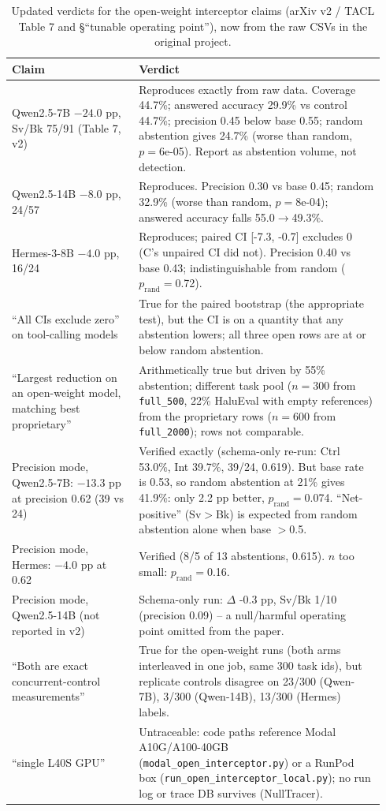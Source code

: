 \begin{table}[t]\centering\small
\caption{Updated verdicts for the open-weight interceptor claims (arXiv v2 / TACL Table 7 and \S``tunable operating point''), now from the raw CSVs in the original project.}
\label{tab:C2_3}
\begin{tabular}{p{0.32\linewidth}p{0.62\linewidth}}
\toprule
Claim & Verdict \\
\midrule
Qwen2.5-7B $-24.0$ pp, Sv/Bk 75/91 (Table 7, v2) & Reproduces exactly from raw data. Coverage 44.7\%; answered accuracy 29.9\% vs control 44.7\%; precision 0.45 below base 0.55; random abstention gives 24.7\% (worse than random, $p{=}$6e-05). Report as abstention volume, not detection. \\
Qwen2.5-14B $-8.0$ pp, 24/57 & Reproduces. Precision 0.30 vs base 0.45; random 32.9\% (worse than random, $p{=}$8e-04); answered accuracy falls 55.0$\to$49.3\%. \\
Hermes-3-8B $-4.0$ pp, 16/24 & Reproduces; paired CI [-7.3, -0.7] excludes 0 (C's unpaired CI did not). Precision 0.40 vs base 0.43; indistinguishable from random ($p_{\mathrm{rand}}{=}$0.72). \\
``All CIs exclude zero'' on tool-calling models & True for the paired bootstrap (the appropriate test), but the CI is on a quantity that any abstention lowers; all three open rows are at or below random abstention. \\
``Largest reduction on an open-weight model, matching best proprietary'' & Arithmetically true but driven by 55\% abstention; different task pool ($n{=}300$ from \texttt{full\_500}, 22\% HaluEval with empty references) from the proprietary rows ($n{=}600$ from \texttt{full\_2000}); rows not comparable. \\
Precision mode, Qwen2.5-7B: $-13.3$ pp at precision 0.62 (39 vs 24) & Verified exactly (schema-only re-run: Ctrl 53.0\%, Int 39.7\%, 39/24, 0.619). But base rate is 0.53, so random abstention at 21\% gives 41.9\%: only 2.2 pp better, $p_{\mathrm{rand}}{=}$0.074. ``Net-positive'' (Sv$>$Bk) is expected from random abstention alone when base $>$0.5. \\
Precision mode, Hermes: $-4.0$ pp at 0.62 & Verified (8/5 of 13 abstentions, 0.615). $n$ too small: $p_{\mathrm{rand}}{=}$0.16. \\
Precision mode, Qwen2.5-14B (not reported in v2) & Schema-only run: $\Delta$ -0.3 pp, Sv/Bk 1/10 (precision 0.09) -- a null/harmful operating point omitted from the paper. \\
``Both are exact concurrent-control measurements'' & True for the open-weight runs (both arms interleaved in one job, same 300 task ids), but replicate controls disagree on 23/300 (Qwen-7B), 3/300 (Qwen-14B), 13/300 (Hermes) labels. \\
``single L40S GPU'' & Untraceable: code paths reference Modal A10G/A100-40GB (\texttt{modal\_open\_interceptor.py}) or a RunPod box (\texttt{run\_open\_interceptor\_local.py}); no run log or trace DB survives (NullTracer). \\
\bottomrule
\end{tabular}
\end{table}
